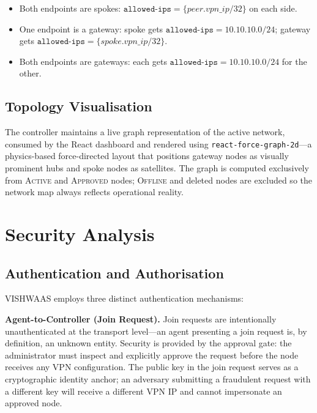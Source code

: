 \documentclass[conference]{IEEEtran}
\begin{document}
\begin{itemize}
  \item Both endpoints are spokes: $\texttt{allowed-ips} = \{\textit{peer.vpn\_ip}/32\}$ on each side.
  \item One endpoint is a gateway: spoke gets $\texttt{allowed-ips} = 10.10.10.0/24$; gateway gets $\texttt{allowed-ips} = \{\textit{spoke.vpn\_ip}/32\}$.
  \item Both endpoints are gateways: each gets $\texttt{allowed-ips} = 10.10.10.0/24$ for the other.
\end{itemize}

\subsection{Topology Visualisation}

The controller maintains a live graph representation of the active network, consumed
by the React dashboard and rendered using \texttt{react-force-graph-2d}---a
physics-based force-directed layout that positions gateway nodes as visually
prominent hubs and spoke nodes as satellites. The graph is computed exclusively
from \textsc{Active} and \textsc{Approved} nodes; \textsc{Offline} and deleted
nodes are excluded so the network map always reflects operational reality.


\FloatBarrier
\section{Security Analysis}
\label{sec:security}

\subsection{Authentication and Authorisation}

VISHWAAS employs three distinct authentication mechanisms:

\textbf{Agent-to-Controller (Join Request).} Join requests are intentionally
unauthenticated at the transport level---an agent presenting a join request is, by
definition, an unknown entity. Security is provided by the approval gate: the
administrator must inspect and explicitly approve the request before the node
receives any VPN configuration. The public key in the join request serves as a
cryptographic identity anchor; an adversary submitting a fraudulent request with a
different key will receive a different VPN IP and cannot impersonate an approved
node.
\end{document}
